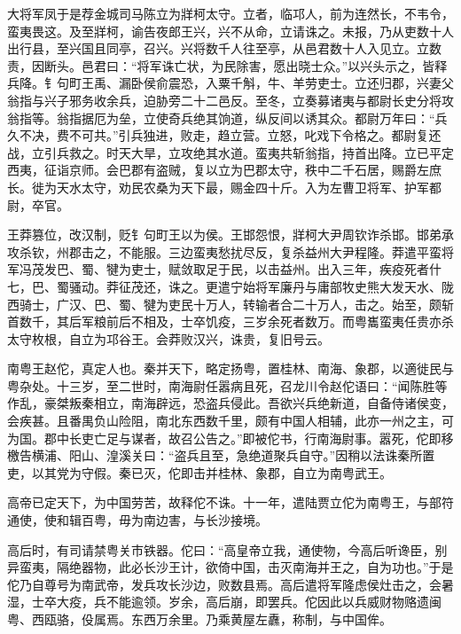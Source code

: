 \documentclass[]{article}
\begin{document}
大将军凤于是荐金城司马陈立为牂柯太守。立者，临邛人，前为连然长，不韦令，蛮夷畏这。及至牂柯，谕告夜郎王兴，兴不从命，立请诛之。未报，乃从吏数十人出行县，至兴国且同亭，召兴。兴将数千人往至亭，从邑君数十人入见立。立数责，因断头。邑君曰：``将军诛亡状，为民除害，愿出晓士众。''以兴头示之，皆释兵降。钅句町王禹、漏卧侯俞震恐，入粟千斛，牛、羊劳吏士。立还归郡，兴妻父翁指与兴子邪务收余兵，迫胁旁二十二邑反。至冬，立奏募诸夷与都尉长史分将攻翁指等。翁指据厄为垒，立使奇兵绝其饷道，纵反间以诱其众。都尉万年曰：``兵久不决，费不可共。''引兵独进，败走，趋立营。立怒，叱戏下令格之。都尉复还战，立引兵救之。时天大旱，立攻绝其水道。蛮夷共斩翁指，持首出降。立已平定西夷，征诣京师。会巴郡有盗贼，复以立为巴郡太守，秩中二千石居，赐爵左庶长。徙为天水太守，劝民农桑为天下最，赐金四十斤。入为左曹卫将军、护军都尉，卒官。

王莽篡位，改汉制，贬钅句町王以为侯。王邯怨恨，牂柯大尹周钦诈杀邯。邯弟承攻杀钦，州郡击之，不能服。三边蛮夷愁扰尽反，复杀益州大尹程隆。莽遣平蛮将军冯茂发巴、蜀、犍为吏士，赋敛取足于民，以击益州。出入三年，疾疫死者什七，巴、蜀骚动。莽征茂还，诛之。更遣宁始将军廉丹与庸部牧史熊大发天水、陇西骑士，广汉、巴、蜀、犍为吏民十万人，转输者合二十万人，击之。始至，颇斩首数千，其后军粮前后不相及，士卒饥疫，三岁余死者数万。而粤巂蛮夷任贵亦杀太守枚根，自立为邛谷王。会莽败汉兴，诛贵，复旧号云。

南粤王赵佗，真定人也。秦并天下，略定扬粤，置桂林、南海、象郡，以適徙民与粤杂处。十三岁，至二世时，南海尉任嚣病且死，召龙川令赵佗语曰：``闻陈胜等作乱，豪桀叛秦相立，南海辟远，恐盗兵侵此。吾欲兴兵绝新道，自备侍诸侯变，会疾甚。且番禺负山险阻，南北东西数千里，颇有中国人相辅，此亦一州之主，可为国。郡中长吏亡足与谋者，故召公告之。''即被佗书，行南海尉事。嚣死，佗即移檄告横浦、阳山、湟溪关曰：``盗兵且至，急绝道聚兵自守。''因稍以法诛秦所置吏，以其党为守假。秦已灭，佗即击并桂林、象郡，自立为南粤武王。

高帝已定天下，为中国劳苦，故释佗不诛。十一年，遣陆贾立佗为南粤王，与部符通使，使和辑百粤，毋为南边害，与长沙接境。

高后时，有司请禁粤关市铁器。佗曰：``高皇帝立我，通使物，今高后听谗臣，别异蛮夷，隔绝器物，此必长沙王计，欲倚中国，击灭南海并王之，自为功也。''于是佗乃自尊号为南武帝，发兵攻长沙边，败数县焉。高后遣将军隆虑侯灶击之，会暑湿，士卒大疫，兵不能逾领。岁余，高后崩，即罢兵。佗因此以兵威财物赂遗闽粤、西瓯骆，伇属焉。东西万余里。乃乘黄屋左纛，称制，与中国侔。
\end{document}
